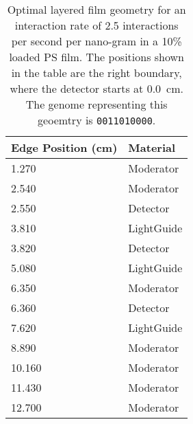 \begin{table}
	\caption[Optimal Layered Film Geometry for 2.5 interaction per second per nanogram Cf-252]{Optimal layered film geometry for an interaction rate of 2.5 interactions per second per nano-gram  in a 10\%  loaded PS film. The positions shown in the table are the right boundary, where the detector starts at \SI{0.0}{\cm}. The genome representing this geoemtry is \texttt{0011010000}.}
	\begin{tabular}{m{3cm} m{4cm}}
	\toprule
	Edge Position (\si{\cm}) & Material \\
	\midrule
1.270&Moderator\\
2.540&Moderator\\
2.550&Detector\\
3.810&LightGuide\\
3.820&Detector\\
5.080&LightGuide\\
6.350&Moderator\\
6.360&Detector\\
7.620&LightGuide\\
8.890&Moderator\\
10.160&Moderator\\
11.430&Moderator\\
12.700&Moderator\\
	\bottomrule
	\end{tabular}
\end{table}
